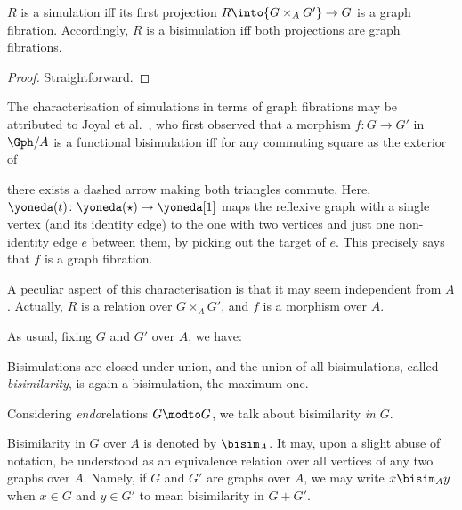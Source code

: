 \documentclass{LMCS}
\theoremstyle{plain}\newtheorem{satz}[thm]{Satz}
\begin{document}
\begin{prop}
  $R$ is a simulation iff its first projection $R \into {G \times_A
    G'} \to G$ is a  graph fibration.  Accordingly, $R$ is a
  bisimulation iff both projections are  graph fibrations.
\end{prop}
\begin{proof}
  Straightforward.
\end{proof}\enlargethispage{3\baselineskip}
\begin{rem}\label{rem:joyal}
  The characterisation of simulations in terms of  graph fibrations may
  be attributed to Joyal et al.~\cite{DBLP:conf/lics/JoyalNW93}, who first observed
   that a morphism $f \colon G \to G'$ in $\Gph/A$ is a functional bisimulation iff
   for any commuting square as the exterior of
   \begin{center}
  \end{center}
  there exists a dashed arrow making both triangles commute.  Here,
  $\yoneda(t) \colon \yoneda(\star) \to \yoneda[1]$ maps the reflexive
  graph with a single vertex (and its identity edge) to the one with
  two vertices and just one non-identity edge $e$ between them, by
  picking out the target of $e$.
  This precisely says that $f$ is a  graph fibration.

  A peculiar aspect of this characterisation is that it may seem
  independent from $A$. Actually, $R$ is a relation over $G \times_A
  G'$, and $f$ is a morphism over $A$.
\end{rem}

As usual, fixing $G$ and $G'$ over $A$, we have:
\begin{prop}
  Bisimulations are closed under union, and the union of all
  bisimulations, called \emph{bisimilarity}, is again a bisimulation,
  the maximum one. 
\end{prop}
Considering \emph{endo}relations $G \modto G$, we talk about
bisimilarity \emph{in} $G$.
\begin{notation}
  Bisimilarity in $G$ over $A$ is denoted by $\bisim_A$. It may, upon
  a slight abuse of notation, be understood as an equivalence relation
  over all vertices of any two graphs over $A$. Namely, if $G$ and
  $G'$ are graphs over $A$, we may write $x \bisim_A y$ when $x \in G$
  and $y \in G'$ to mean bisimilarity in $G + G'$.
\end{notation}
\end{document}
